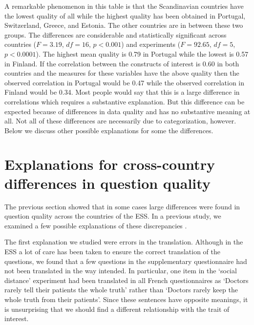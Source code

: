 \documentclass[a4paper,12pt]{article}
\begin{document}
A remarkable phenomenon in this table is that the Scandinavian countries have the lowest quality of all while the highest quality has been obtained in Portugal, Switzerland, Greece, and Estonia. The other countries are in between these two groups. 
The differences are considerable and statistically significant across countries ($F=3.19$, $df=16$, $p<0.001$) and experiments ($F=92.65$, $df=5$, $p<0.0001$). The highest mean quality is 0.79 in Portugal while the lowest is 0.57 in Finland. If the correlation between the constructs of interest is 0.60 in both countries and the measures for these variables have the above quality then the observed correlation in Portugal would be 0.47 while the observed correlation in Finland would be 0.34. Most people would say that this is a large difference in correlations which requires a substantive explanation. But this difference can be expected because of differences in data quality and has no substantive meaning at all. Not all of these differences are necessarily due to categorization, however. Below we discuss other possible explanations for some the differences.

\section{Explanations for cross-country differences in question quality}

The previous section showed that in some cases large differences were found in question quality across the countries of the ESS. In a previous study, we examined a few possible explanations of these discrepancies \citep{oberski_differences_}.

The first explanation we studied were errors in the translation. Although in the ESS a lot of care has been taken to ensure the correct translation of the questions, we found that a few questions in the supplementary questionnaire had not been translated in the way intended. In particular, one item in the `social distance' experiment had been translated in all French questionnaires as `Doctors rarely tell their patients the whole truth' rather than `Doctors rarely keep the whole truth from their patients'. Since these sentences have opposite meanings, it is unsurprising that we should find a different relationship with the trait of interest.
\end{document}
